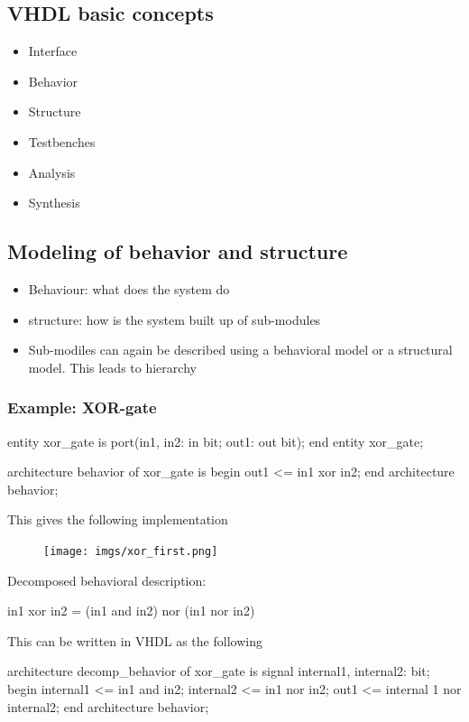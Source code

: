 \documentclass[a4paper,11pt,norsk]{article}
\begin{document}
\subsection{VHDL basic concepts}
\begin{itemize}
    \item Interface
    \item Behavior
    \item Structure
    \item Testbenches
    \item Analysis
    \item Synthesis
\end{itemize}

\subsection{Modeling of behavior and structure}
\begin{itemize}
    \item Behaviour: what does the system do
    \item structure: how is the system built up of sub-modules
    \item Sub-modiles can again be described using a behavioral model or a structural model. This leads to hierarchy
\end{itemize}

\subsubsection{Example: XOR-gate}
\begin{vhdlcode}
entity xor_gate is
    port(in1, in2: in bit; out1: out bit);
end entity xor_gate;

architecture behavior of xor_gate is
begin
    out1 <= in1 xor in2;
end architecture behavior;
\end{vhdlcode}
This gives the following implementation

\begin{figure}[H]
    \centering
    \texttt{[image: imgs/xor\_first.png]}
\end{figure}

Decomposed behavioral description:
\begin{vhdlcode}
in1 xor in2 = (in1 and in2) nor (in1 nor in2) 
\end{vhdlcode}

This can be written in VHDL as the following
\begin{vhdlcode}
architecture decomp_behavior of xor_gate is
    signal internal1, internal2: bit;
begin
    internal1 <= in1 and in2;
    internal2 <= in1 nor in2;
    out1 <= internal 1 nor internal2;
end architecture behavior;
\end{vhdlcode}
\end{document}
